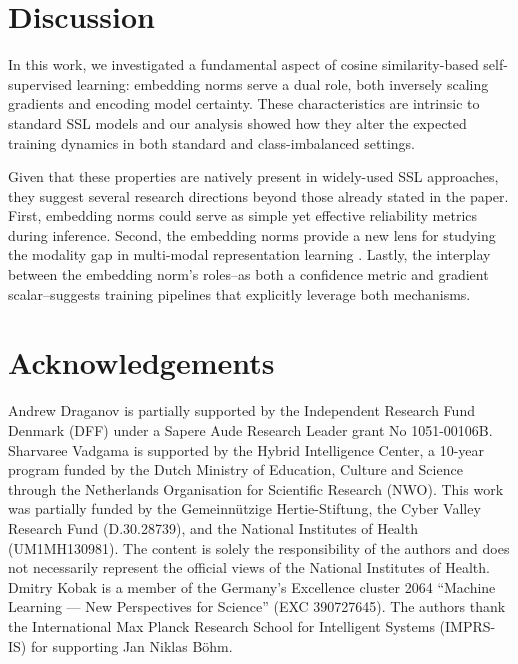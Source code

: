 \section{Discussion}

In this work, we investigated a fundamental aspect of cosine similarity-based self-supervised learning: embedding norms serve a dual role, both inversely scaling gradients and encoding model certainty. These characteristics are intrinsic to standard SSL models and our analysis showed how they alter the expected training dynamics in both standard and class-imbalanced settings.

Given that these properties are natively present in widely-used SSL approaches, they suggest several research directions beyond those already stated in the paper. First, embedding norms could serve as simple yet effective reliability metrics during inference. Second, the embedding norms provide a new lens for studying the modality gap in multi-modal representation learning \cite{mindthegap}. Lastly, the interplay between the embedding norm's roles--as both a confidence metric and gradient scalar--suggests training pipelines that explicitly leverage both mechanisms.

\section*{Acknowledgements}

Andrew Draganov is partially supported by the Independent Research Fund Denmark (DFF) under a Sapere Aude Research Leader grant No 1051-00106B. 
Sharvaree Vadgama is supported by the Hybrid Intelligence Center, a 10-year program funded by the Dutch Ministry of Education, Culture and Science through the Netherlands Organisation for Scientific Research (NWO). This work was partially funded by the Gemeinnützige Hertie-Stiftung, the Cyber Valley Research Fund (D.30.28739), and the National Institutes of Health (UM1MH130981). The content is solely the responsibility of the authors and does not necessarily represent the official views of the National Institutes of Health. Dmitry Kobak is a member of the Germany’s Excellence cluster 2064 ``Machine Learning --- New Perspectives for Science'' (EXC 390727645). The authors thank the International Max Planck Research School for Intelligent Systems (IMPRS-IS) for supporting Jan Niklas B\"ohm.
\newpage


